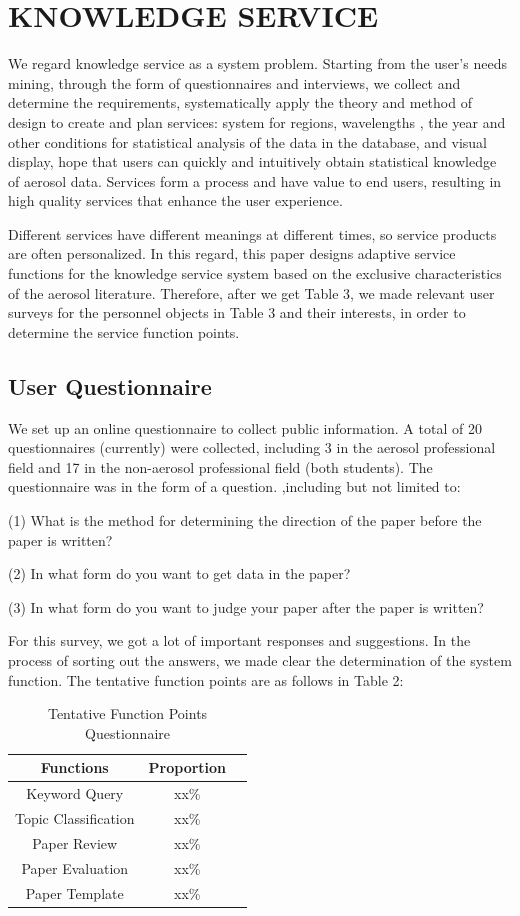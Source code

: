\section{KNOWLEDGE SERVICE}
We regard knowledge service as a system problem. Starting from the user's needs mining, through the form of questionnaires and interviews, we collect and determine the requirements, systematically apply the theory and method of design to create and plan services: system for regions, wavelengths , the year and other conditions for statistical analysis of the data in the database, and visual display, hope that users can quickly and intuitively obtain statistical knowledge of aerosol data. Services form a process and have value to end users, resulting in high quality services that enhance the user experience.

Different services have different meanings at different times, so service products are often personalized. In this regard, this paper designs adaptive service functions for the knowledge service system based on the exclusive characteristics of the aerosol literature. Therefore, after we get Table 3, we made relevant user surveys for the personnel objects in Table 3 and their interests, in order to determine the service function points.

\subsection{User Questionnaire}
We set up an online questionnaire to collect public information. A total of 20 questionnaires (currently) were collected, including 3 in the aerosol professional field and 17 in the non-aerosol professional field (both students). The questionnaire was in the form of a question. ,including but not limited to:

(1) What is the method for determining the direction of the paper before the paper is written?

(2) In what form do you want to get data in the paper?

(3) In what form do you want to judge your paper after the paper is written?

For this survey, we got a lot of important responses and suggestions. In the process of sorting out the answers, we made clear the determination of the system function. The tentative function points are as follows in Table 2:

\begin{table}
	\caption{Tentative Function Points Questionnaire}
	\label{tab:freq}
	\begin{tabular}{ccl}
		\toprule
		Functions&Proportion\\
		\midrule
		Keyword Query & xx\%\\
		Topic Classification & xx\%\\
		Paper Review & xx\%\\
		Paper Evaluation & xx\%\\
		Paper Template & xx\%\\
		\bottomrule
	\end{tabular}
\end{table}

